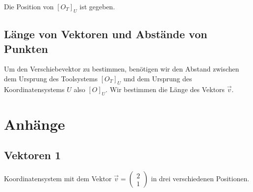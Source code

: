 \documentclass{article}
\newcommand{\m}[1]{\begin{pmatrix}#1\end{pmatrix}}
\begin{document}

    Die Position von ${[{O}_{T}]}_{U}$ ist gegeben.

    \subsection{Länge von Vektoren und Abstände von Punkten}
    Um den Verschiebevektor zu bestimmen, benötigen wir den Abstand zwischen dem Ursprung
    des Toolsystems ${[{O}_{T}]}_{U}$ und dem Ursprung des Koordinatensystems $U$
    also ${[O]}_{U}$.
    Wir bestimmen die Länge des Vektors $\vec{v}$.


    




    


    \newpage

    \section{Anhänge}

    \subsection{Vektoren 1}
    \begin{figure}[h]
        \centering
    \end{figure}
    Koordinatensystem mit dem Vektor $\vec{v} = \m{2 \\ 1}$ in drei verschiedenen Positionen.
\end{document}
